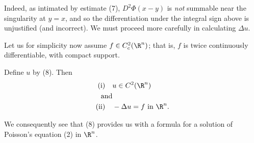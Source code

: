 Indeed, as intimated by estimate (7), $D^2\Phi(x-y)$ is \textit{not} summable near the singularity at $y=x$, and so the differentiation under the integral sign above is unjustified (and incorrect). We must proceed more carefully in calculating $\Delta u$.

Let us for simplicity now assume $f \in C_c^2(\R^n)$; that is, $f$ is twice continuously differentiable, with compact support.

\begin{theorem}
\label{thm:poisson-equation-solution-formula}
Define $u$ by (8). Then
\begin{align*}
\text{(i)} \quad & u \in C^2(\R^n)\\
\text{and}\\
\text{(ii)} \quad & -\Delta u = f \text{ in } \R^n.
\end{align*}
\end{theorem}

We consequently see that (8) provides us with a formula for a solution of Poisson's equation (2) in $\R^n$.

